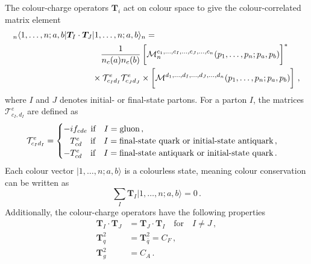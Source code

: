 \documentclass[main.tex]{subfiles}
\begin{document}
    The colour-charge operators $\bm{T}_{i}$ act on colour space
    to give the colour-correlated matrix element
    \begin{equation}
        \label{eqn:charge_operator}
        \begin{split}
            {}_{n} \langle 1, \ldots, n ; a, b | \bm{T}_{I} \cdot \bm{T}_{J} &| 1, \ldots, n ; a, b \rangle_{n} = \\
            & \quad \dfrac{1}{n_{c}(a)n_{c}(b)} \left[ \vphantom{\dfrac{1}{1}} \mathcal{M}_{n}^{c_{1},\ldots,c_{I},\ldots,c_{J},\ldots,c_{n}}(p_{1},\ldots,p_{n};p_{a},p_{b}) \right]^{*} \\
            &\times \mathcal{T}^{e}_{c_{I}d_{I}}\mathcal{T}^{e}_{c_{J}d_{J}} \times \left[ \vphantom{\dfrac{1}{1}} \mathcal{M}^{d_{1},\ldots,d_{I},\ldots,d_{J},\ldots,d_{n}}(p_{1},\ldots,p_{n};p_{a},p_{b})\right] \, ,
        \end{split}
    \end{equation}
    where $I$ and $J$ denotes initial- or final-state partons.
    For a parton $I$, the matrices $\mathcal{T}^{e}_{c_{I},d_{I}}$ are defined as
    \begin{equation}
        \mathcal{T}^{e}_{c_{I}d_{I}} =
        \begin{cases}
            -i f_{cde} \hspace{-6pt} \quad \text{if} \quad I = \text{gluon} \, , \\
            \hphantom{-} T^{e}_{cd} \quad \text{if} \quad I = \text{final-state quark or initial-state antiquark} \, , \\
            -T^{e}_{cd} \quad \text{if} \quad I = \text{final-state antiquark or initial-state quark} \, .
        \end{cases}
    \end{equation}
    Each colour vector $|1, \ldots, n; a, b \rangle$ is a colourless
    state, meaning colour conservation can be written as
    \begin{equation}
        \sum_{I} \bm{T}_{I} |1, \ldots, n; a, b \rangle = 0 \, .
    \end{equation}
    Additionally, the colour-charge operators have the following properties
    \begin{align}
        \bm{T}_{I} \cdot \bm{T}_{J} &= \bm{T}_{J} \cdot \bm{T}_{I} \quad \text{for} \quad I \neq J \, , \nonumber \\
        \bm{T}^{2}_{q} &= \bm{T}^{2}_{\bar{q}} = C_{F} \, ,\\
        \bm{T}^{2}_{g} &= C_{A} \, . \nonumber
    \end{align}
\end{document}
